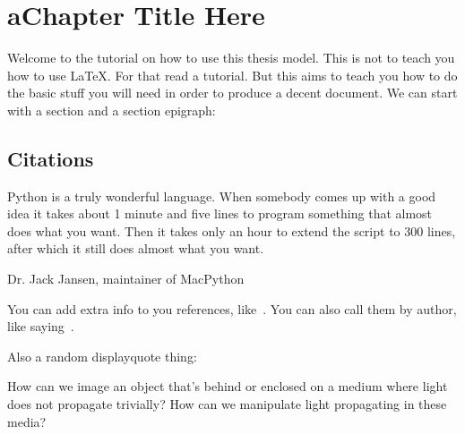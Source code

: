 
\chapter{aChapter Title Here}


\label{ChapterTemplate}


Welcome to the tutorial on how to use this thesis model. This is not to teach
you how to use \LaTeX. For that read a tutorial. But this aims to teach you how
to do the basic stuff you will need in order to produce a decent document.
We can start with a section and a section epigraph:

\section{Citations}
\epigraph{Python is a truly wonderful language. When somebody comes up with a good idea it takes about 1 minute and five lines to program something that almost does what you want. Then it takes only an hour to extend the script to 300 lines, after which it still does almost what you want.}{Dr. Jack Jansen,  maintainer of MacPython}

You can add extra info to you references, like~\cite{Fienup1982}. You
can also call them by author, like saying~\citet{Fienup1982}.

Also a random displayquote thing:

\begin{displayquote}
    How can we image an object that's behind or enclosed on a medium where light does not propagate trivially? How can we manipulate light propagating in these media?
\end{displayquote}

